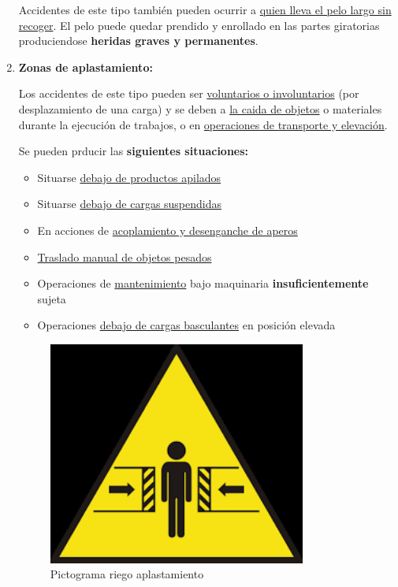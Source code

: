 \documentclass[a4paper,12pt,oneside]{book}
\begin{document}
\begin{enumerate}
Accidentes de este tipo también pueden ocurrir a \uline{quien lleva el pelo largo sin
recoger}. El pelo puede quedar prendido y enrollado en las partes giratorias
produciendose \textbf{heridas graves y permanentes}.

\item \textbf{Zonas de aplastamiento:}
\label{sec:org836a3c0}

Los accidentes de este tipo pueden ser \uline{voluntarios o involuntarios} (por
desplazamiento de una carga) y se deben a \uline{la caida de objetos} o materiales
durante la ejecución de trabajos, o en \uline{operaciones de transporte y elevación}.

Se pueden prducir las \textbf{siguientes situaciones:}
\begin{itemize}
\item Situarse \uline{debajo de productos apilados}
\item Situarse \uline{debajo de cargas suspendidas}
\item En acciones de \uline{acoplamiento y desenganche de aperos}
\item \uline{Traslado manual de objetos pesados}
\item Operaciones de \uline{mantenimiento} bajo maquinaria \textbf{insuficientemente} sujeta
\item Operaciones \uline{debajo de cargas basculantes} en posición elevada
\end{itemize}

\begin{figure}[htbp]
\centering
\includegraphics[width=0.8\textwidth]{./img_0009/aplastamiento.png}
\caption{Pictograma riego aplastamiento}
\end{figure}


\end{enumerate}
\end{document}
